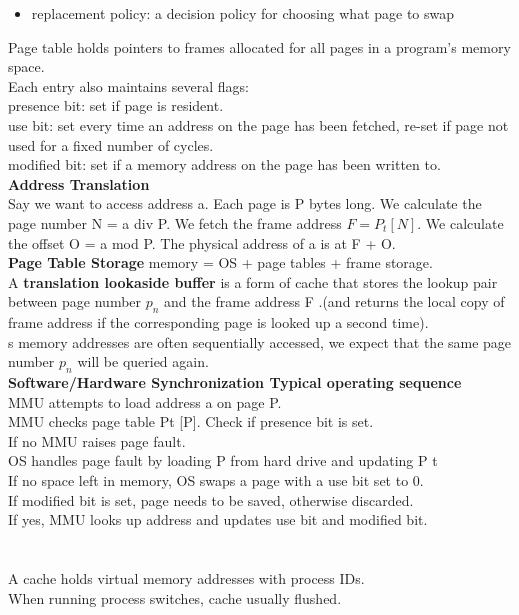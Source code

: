 \documentclass[letterpaper, 8pt]{extarticle}
\begin{document}
\begin{multicols*}{6}
\begin{itemize}
	\item replacement policy: a decision policy for choosing what page to swap
	\end{itemize}
	Page table holds pointers to frames allocated for all pages in a program’s memory space.\\
	Each entry also maintains several flags:\\
	presence bit: set if page is resident.\\
	use bit: set every time an address on the page has been fetched, re-set if page not used for a fixed number of cycles.\\
	modified bit: set if a memory address on the page has been written to.\\
	\textbf{Address Translation}\\
	Say we want to access address a. Each page is P bytes long. We calculate the page number N = a div P. We fetch the frame address $F = P_t[N]$. We calculate the offset O = a mod P. The physical address of a is at F + O.\\
	\textbf{Page Table Storage} memory = OS + page tables + frame storage.\\
	A \textbf{translation lookaside buffer} is a form of cache that stores the lookup pair between page number $p_n$ and the frame address F .(and returns the local copy of frame address if the corresponding page is looked up a second time).\\
s memory addresses are often sequentially accessed, we expect that the same page number $p_n$ will be queried again.\\

	\textbf{Software/Hardware Synchronization Typical operating sequence}\\
	MMU attempts to load address a on page P.\\
	MMU checks page table Pt [P]. Check if presence bit is set.\\
	If no MMU raises page fault.\\
	OS handles page fault by loading P from hard drive and updating P t\\
	If no space left in memory, OS swaps a page with a use bit set to 0.\\
	If modified bit is set, page needs to be saved, otherwise discarded.\\
	If yes, MMU looks up address and updates use bit and modified bit.\\~\\~\\
	A cache holds virtual memory addresses with process IDs.\\
	When running process switches, cache usually flushed.

\end{multicols*}
\end{document}
